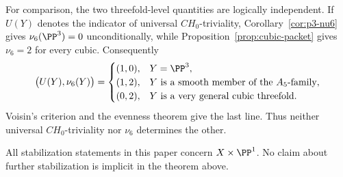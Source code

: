 For comparison, the two threefold-level quantities are logically
independent.  If \(U(Y)\) denotes the indicator of universal
\(CH_0\)-triviality, Corollary~\ref{cor:p3-nu6} gives
\(\nu_6(\PP^3)=0\) unconditionally, while
Proposition~\ref{prop:cubic-packet} gives \(\nu_6=2\) for every cubic.
Consequently
\[
 \bigl(U(Y),\nu_6(Y)\bigr)=
 \begin{cases}
  (1,0),&Y=\PP^3,\\
  (1,2),&Y\text{ is a smooth member of the }A_5\text{-family},\\
  (0,2),&Y\text{ is a very general cubic threefold}.
 \end{cases}
\]
Voisin's criterion \cite[Corollary~4.4]{Voisin} and the evenness theorem
\cite[Theorem~1.3 and Corollary~1.4]{EdGFS} give the last line.  Thus neither
universal \(CH_0\)-triviality nor \(\nu_6\) determines the other.

All stabilization statements in this paper concern \(X\times\PP^1\).  No
claim about further stabilization is implicit in the theorem above.
